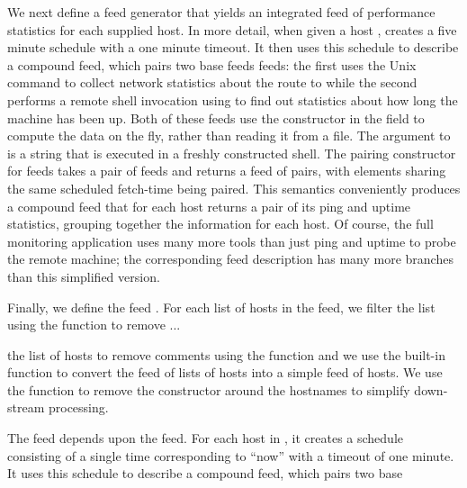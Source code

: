 We next define a feed generator  that yields an
integrated feed of performance statistics for each supplied host.  In
more detail, when given a host ,  creates a five
minute schedule with a one minute timeout. It then uses this schedule
to describe a compound feed, which pairs two base feeds feeds: the
first uses the Unix command  to collect network statistics
about the route to  while the second performs a remote shell
invocation using  to find out statistics about how long the
machine has been up.  Both of these feeds use the 
constructor in the  field to compute the data on the fly,
rather than reading it from a file.  The argument to  is a
string that is executed in a freshly constructed shell.  The pairing
constructor for feeds takes a pair of feeds and returns a feed of
pairs, with elements sharing the same scheduled fetch-time being
paired. This semantics conveniently produces a compound feed that for
each host returns a pair of its ping and uptime statistics, grouping
together the information for each host.  Of course, the full
\vizGems{} monitoring application uses many more tools than just ping
and uptime to probe the remote machine; the corresponding feed
description has many more branches than this simplified version.

Finally, we define the feed .  For each list of hosts in the
 feed, we filter the list using the  function
to remove ...

the list of hosts to remove comments using the  function
and we use the built-in  function to convert the feed of
lists of hosts into a simple feed of hosts.  We use the 
function to remove the  constructor around the hostnames to
simplify down-stream processing.

The  feed depends upon the  feed.  For each host
 in , it creates a schedule consisting of a single
time corresponding to ``now'' with a timeout of one minute.  It uses
this schedule  to describe a compound feed, which pairs two base


